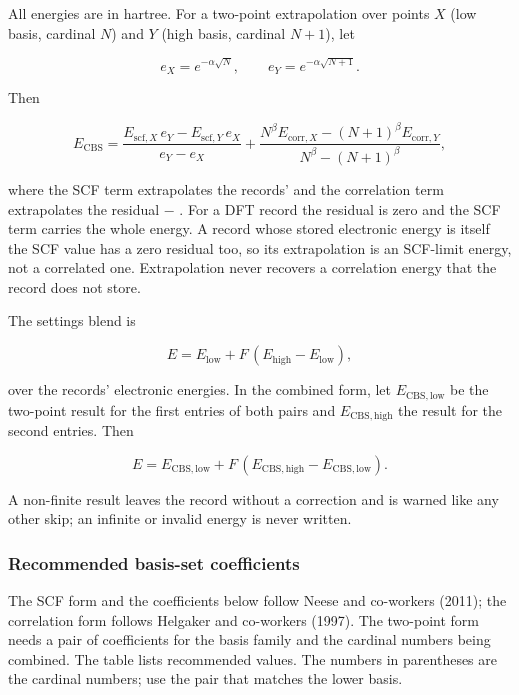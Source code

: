 All energies are in hartree. For a two-point extrapolation over points $X$
(low basis, cardinal $N$) and $Y$ (high basis, cardinal $N+1$), let

\begin{equation}
e_X = e^{-\alpha\sqrt{N}}, \qquad
e_Y = e^{-\alpha\sqrt{N+1}}.
\end{equation}

Then

\begin{equation}
E_{\mathrm{CBS}} =
\frac{E_{\mathrm{scf},X}\,e_Y - E_{\mathrm{scf},Y}\,e_X}{e_Y-e_X}
+
\frac{N^\beta E_{\mathrm{corr},X} - (N+1)^\beta E_{\mathrm{corr},Y}}
     {N^\beta - (N+1)^\beta},
\end{equation}

where the SCF term extrapolates the records'  and the
correlation term extrapolates the residual
 $-$ . For a DFT record the residual
is zero and the SCF term carries the whole energy. A record whose stored
electronic energy is itself the SCF value has a zero residual too, so its
extrapolation is an SCF-limit energy, not a correlated one. Extrapolation
never recovers a correlation energy that the record does not store.

The settings blend is

\begin{equation}
E = E_{\mathrm{low}} + F\,(E_{\mathrm{high}} - E_{\mathrm{low}}),
\end{equation}

over the records' electronic energies. In the combined form, let
$E_{\mathrm{CBS,low}}$ be the two-point result for the first entries of both
pairs and $E_{\mathrm{CBS,high}}$ the result for the second entries. Then

\begin{equation}
E = E_{\mathrm{CBS,low}}
  + F\,(E_{\mathrm{CBS,high}} - E_{\mathrm{CBS,low}}).
\end{equation}

A non-finite result leaves the record without a correction and is warned like
any other skip; an infinite or invalid energy is never written.

\subsubsection*{Recommended basis-set coefficients}

The SCF form and the coefficients below follow Neese and co-workers (2011);
the correlation form follows Helgaker and co-workers (1997). The two-point
form needs a pair of coefficients for the basis family and the cardinal
numbers being combined. The table lists recommended values. The numbers in
parentheses are the cardinal numbers; use the pair that matches the lower
basis.

